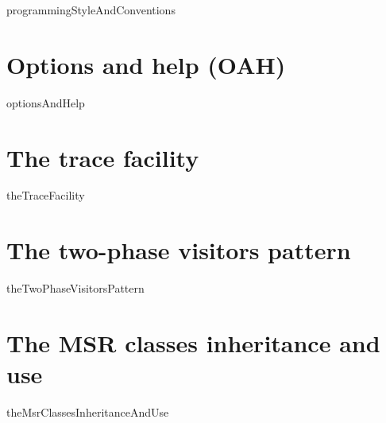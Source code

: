 \documentclass[12pt,a4paper]{article}
\begin{document}
{programmingStyleAndConventions}


\section{Options and help (OAH)}

{optionsAndHelp}


\section{The trace facility}

{theTraceFacility}


\section{The two-phase visitors pattern}

{theTwoPhaseVisitorsPattern}


\section{The MSR classes inheritance and use}

{theMsrClassesInheritanceAndUse}


\end{document}
